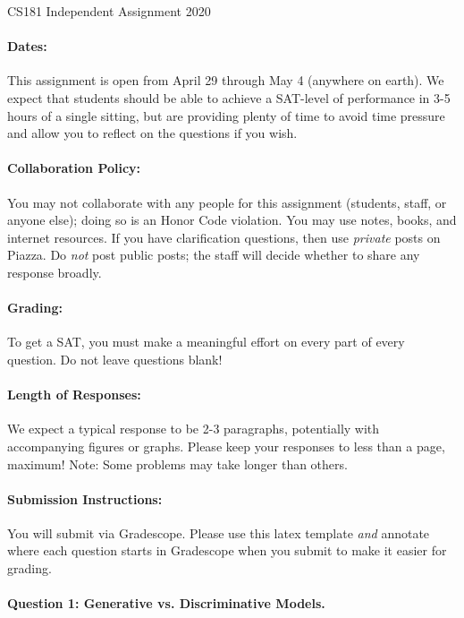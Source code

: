 \documentclass[12pt,letterpaper]{article}
\begin{document}
\begin{center}
\Large{
CS181 Independent Assignment 2020}
\end{center}

\paragraph{Dates:} This assignment is open from April 29 through May 4 (anywhere on earth).  We expect that students should be able to achieve a SAT-level of performance in 3-5 hours of a single sitting, but are providing plenty of time to avoid time pressure and allow you to reflect on the questions if you wish.  

\paragraph{Collaboration Policy:} You may not collaborate with any people for this assignment (students, staff, or anyone else); doing so is an Honor Code violation.  You may use notes, books, and internet resources.  If you have clarification questions, then use \emph{private} posts on Piazza.  Do \emph{not} post public posts; the staff will decide whether to share any response broadly.

\paragraph{Grading:} To get a SAT, you must make a meaningful effort on every part of every question.  Do not leave questions blank!

\paragraph{Length of Responses:} We expect a typical response to be 2-3 paragraphs, potentially with accompanying figures or graphs.  Please keep your responses to less than a page, maximum!  Note: Some problems may take longer than others.

\paragraph{Submission Instructions:} You will submit via Gradescope.  Please use this latex template \emph{and} annotate where each question starts in Gradescope when you submit to make it easier for grading.  

\newpage

\paragraph{Question 1: Generative vs. Discriminative Models.}
\end{document}
